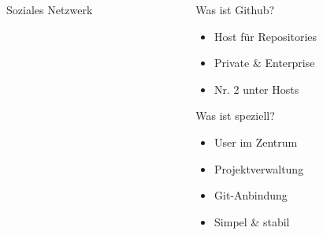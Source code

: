 \begin{frame}
\begin{columns}
\begin{column}{5cm}
\begin{figure}
                \caption{Soziales Netzwerk}
            \end{figure}
        \end{column}
        \begin{column}{5cm}
            \begin{block}{Was ist Github?}
                \begin{itemize}
                    \item Host für Repositories
                    \item Private \& Enterprise
                    \item Nr. 2 unter Hosts
                \end{itemize}
            \end{block}
            \begin{block}{Was ist speziell?}
                \begin{itemize}
                    \item User im Zentrum
                    \item Projektverwaltung
                    \item Git-Anbindung
                    \item Simpel \& stabil
                \end{itemize}
            \end{block}
        \end{column}
    \end{columns}
\end{frame}

